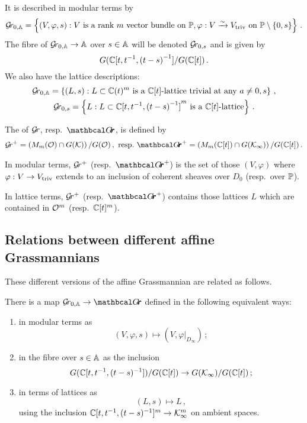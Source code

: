 \documentclass{article}
\begin{document}
% 
It is described in modular terms by 
\[
\Grbd = 
    \left\{ 
        (V,\varphi,s) : V\text{ is a rank \(m\) vector bundle on }\PP, \varphi : V \xrightarrow{\sim} \Vtriv \text{ on } \PP \setminus \{0, s\}  
    \right\}\,. 
\]
% 
The fibre of \(\Grbd \to \AA\) over \( s \in \AA \) will be denoted \( \Gr_{0,s} \) and is given by
% 
\[  
    G(\CC[t, t^{-1}, {(t-s)}^{-1}]/G(\CC[t])\,. %
\]
We also have the lattice descriptions:
% 
\begin{gather*}
\Grbd = 
    \left \{ 
        (L,s) : L \subset  \CC(t)^m\text{ is a \(\CC[t]\)-lattice trivial at any }a \ne 0, s 
    \right \} \,, \\
\Gr_{0,s} = 
    \left \{ 
        L : L \subset  {\CC[t,t^{-1},{(t-s)}^{-1}]}^m \text{ is a \(\CC[t]\)-lattice} 
    \right \} \,.
\end{gather*}
% 
\begin{definition}\label{def:grplus}
The  of \(\Gr \), resp.\ \(\Grth\), is defined by 
\begin{gather*}
    \Gr^+ = \left(M_m(\cO) \cap G(\cK)\right) / G(\cO)\,,\,\, 
    \text{resp.\ } {\Grth}^+ = \left(M_m(\CC[t]) \cap G(\Kinf)\right) / G(\CC[t])\,. 
\end{gather*}
\end{definition}
% 
In modular terms, \(\Gr^+\) (resp.\ \({\Grth}^+\)) is the set of those \( (V, \varphi)\) where \( \varphi : V \rightarrow \Vtriv \) extends to an inclusion of coherent sheaves over \( D_0 \) (resp.\ over \( \PP\)).

In lattice terms, \( \Gr^+\) (resp.\ \({\Grth}^+\)) contains those lattices \(L\) which are contained in \(\cO^m\) (resp.\ \(\CC[t]^m\)).
% 

\subsection{Relations between different affine Grassmannians}\label{ss:relsbtwgrs}
% 
These different versions of the affine Grassmannian are related as follows.  
% 
\begin{proposition}\label{pr:bd-th}
    There is a map \(\Grbd \rightarrow \Grth \) defined in the following equivalent ways:
    \begin{enumerate}
        \item in modular terms as \[(V,\varphi,s)\mapsto (V, \varphi \big|_{D_\infty}) \, ;\]
        \item in the fibre over \( s \in \AA\) as the inclusion 
        \[
            G(\CC[t, t^{-1}, (t-s)^{-1}])/ G(\CC[t]) \rightarrow G(\Kinf)/G(\CC[t])\,;
        \]
        \item in terms of lattices as \[ (L,s)\mapsto L \,,\] using the inclusion \(\CC[t, t^{-1}, (t-s)^{-1}]^m \rightarrow \Kinf^m\) on ambient spaces. 
    \end{enumerate}
\end{proposition}
% 
\end{document}
